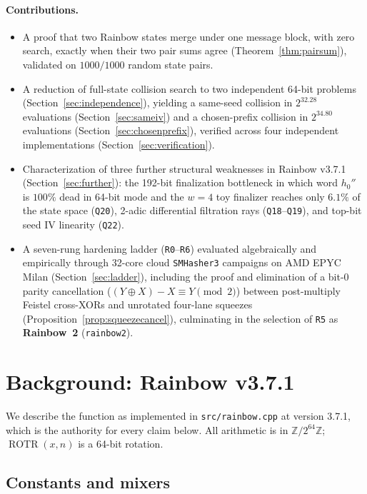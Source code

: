 \documentclass[10pt]{article}
\theoremstyle{definition}
\newcommand{\W}{\mathbb{Z}/2^{64}\mathbb{Z}}
\newcommand{\ROTR}{\operatorname{ROTR}}
\newcommand{\code}[1]{\texttt{#1}}
\begin{document}
\paragraph{Contributions.}
\begin{itemize}
  \item A proof that two Rainbow states merge under one message block, with zero search, exactly when their two pair sums agree (Theorem~\ref{thm:pairsum}), validated on $1000/1000$ random state pairs.
  \item A reduction of full-state collision search to two independent 64-bit problems (Section~\ref{sec:independence}), yielding a same-seed collision in $2^{32.28}$ evaluations (Section~\ref{sec:sameiv}) and a chosen-prefix collision in $2^{34.80}$ evaluations (Section~\ref{sec:chosenprefix}), verified across four independent implementations (Section~\ref{sec:verification}).
  \item Characterization of three further structural weaknesses in Rainbow v3.7.1 (Section~\ref{sec:further}): the 192-bit finalization bottleneck in which word $h_0''$ is $100\%$ dead in 64-bit mode and the $w=4$ toy finalizer reaches only $6.1\%$ of the state space (\code{Q20}), 2-adic differential filtration rays (\code{Q18}--\code{Q19}), and top-bit seed IV linearity (\code{Q22}).
  \item A seven-rung hardening ladder (\code{R0}--\code{R6}) evaluated algebraically and empirically through 32-core cloud \code{SMHasher3} campaigns on AMD EPYC Milan (Section~\ref{sec:ladder}), including the proof and elimination of a bit-0 parity cancellation ($(Y \oplus X) - X \equiv Y \pmod 2$) between post-multiply Feistel cross-XORs and unrotated four-lane squeezes (Proposition~\ref{prop:squeezecancel}), culminating in the selection of \code{R5} as \textbf{Rainbow~2} (\code{rainbow2}).
\end{itemize}

\section{Background: Rainbow v3.7.1}
\label{sec:background}

We describe the function as implemented in \code{src/rainbow.cpp} at version 3.7.1, which is the authority for every claim below. All arithmetic is in $\W$; $\ROTR(x,n)$ is a 64-bit rotation.

\subsection{Constants and mixers}
\end{document}
